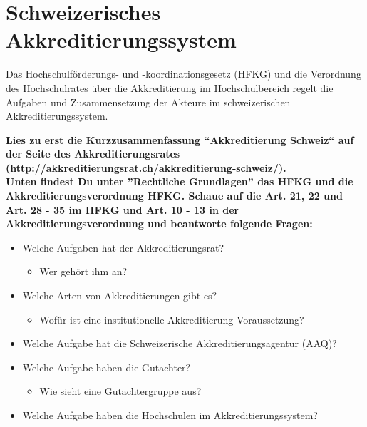 \documentclass{scrartcl}
\begin{document}
\pagestyle{scrheadings}
\clearscrheadfoot
{}
\section*{Schweizerisches Akkreditierungssystem}

Das Hochschulförderungs- und -koordinationsgesetz (HFKG) und die Verordnung des Hochschulrates über die Akkreditierung im Hochschulbereich regelt die Aufgaben und Zusammensetzung der Akteure im schweizerischen Akkreditierungssystem.

\vspace{1cm}

\textbf{Lies zu erst die Kurzzusammenfassung ``Akkreditierung Schweiz`` auf der Seite des Akkreditierungsrates (http://akkreditierungsrat.ch/akkreditierung-schweiz/).\\
Unten findest Du  unter ''Rechtliche  Grundlagen'' das HFKG und die Akkreditierungsverordnung HFKG. Schaue auf die Art. 21, 22 und Art. 28 - 35 im HFKG und Art. 10 - 13 in der Akkreditierungsverordnung und beantworte folgende Fragen:}

\begin{itemize}
\item Welche Aufgaben hat der Akkreditierungsrat?
	\begin{itemize}
		\item Wer gehört ihm an?
	\end{itemize}
\item Welche Arten von Akkreditierungen gibt es?
\begin{itemize}
\item Wofür ist eine institutionelle Akkreditierung Voraussetzung?
\end{itemize}
\item Welche Aufgabe hat die Schweizerische Akkreditierungsagentur (AAQ)? 
\item Welche Aufgabe haben die Gutachter? 
	\begin{itemize}
		\item Wie sieht eine Gutachtergruppe aus?
	\end{itemize}
\item Welche Aufgabe haben die Hochschulen im Akkreditierungssystem?
\end{itemize}


\vspace{1cm}
\end{document}
